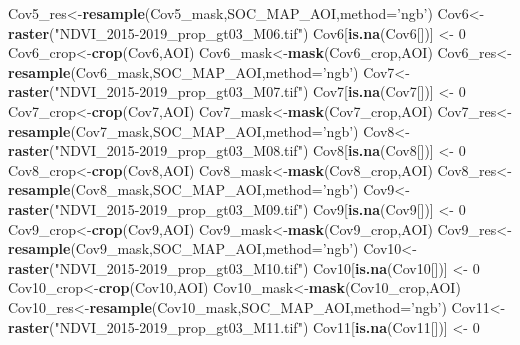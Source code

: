 \documentclass[
  10pt,
  b5paper,
]{book}
\newenvironment{Shaded}{\begin{snugshade}}{\end{snugshade}}
\newcommand{\DataTypeTok}[1]{\textcolor[rgb]{0.13,0.29,0.53}{#1}}
\newcommand{\DecValTok}[1]{\textcolor[rgb]{0.00,0.00,0.81}{#1}}
\newcommand{\KeywordTok}[1]{\textcolor[rgb]{0.13,0.29,0.53}{\textbf{#1}}}
\newcommand{\NormalTok}[1]{#1}
\newcommand{\StringTok}[1]{\textcolor[rgb]{0.31,0.60,0.02}{#1}}
\begin{document}
\begin{Shaded}
\begin{Highlighting}[]
\NormalTok{Cov5_res<-}\KeywordTok{resample}\NormalTok{(Cov5_mask,SOC_MAP_AOI,}\DataTypeTok{method=}\StringTok{'ngb'}\NormalTok{) }
\NormalTok{Cov6<-}\KeywordTok{raster}\NormalTok{(}\StringTok{"NDVI_2015-2019_prop_gt03_M06.tif"}\NormalTok{)}
\NormalTok{Cov6[}\KeywordTok{is.na}\NormalTok{(Cov6[])] <-}\StringTok{ }\DecValTok{0}
\NormalTok{Cov6_crop<-}\KeywordTok{crop}\NormalTok{(Cov6,AOI)}
\NormalTok{Cov6_mask<-}\KeywordTok{mask}\NormalTok{(Cov6_crop,AOI)}
\NormalTok{Cov6_res<-}\KeywordTok{resample}\NormalTok{(Cov6_mask,SOC_MAP_AOI,}\DataTypeTok{method=}\StringTok{'ngb'}\NormalTok{) }
\NormalTok{Cov7<-}\KeywordTok{raster}\NormalTok{(}\StringTok{"NDVI_2015-2019_prop_gt03_M07.tif"}\NormalTok{)}
\NormalTok{Cov7[}\KeywordTok{is.na}\NormalTok{(Cov7[])] <-}\StringTok{ }\DecValTok{0}
\NormalTok{Cov7_crop<-}\KeywordTok{crop}\NormalTok{(Cov7,AOI)}
\NormalTok{Cov7_mask<-}\KeywordTok{mask}\NormalTok{(Cov7_crop,AOI)}
\NormalTok{Cov7_res<-}\KeywordTok{resample}\NormalTok{(Cov7_mask,SOC_MAP_AOI,}\DataTypeTok{method=}\StringTok{'ngb'}\NormalTok{) }
\NormalTok{Cov8<-}\KeywordTok{raster}\NormalTok{(}\StringTok{"NDVI_2015-2019_prop_gt03_M08.tif"}\NormalTok{)}
\NormalTok{Cov8[}\KeywordTok{is.na}\NormalTok{(Cov8[])] <-}\StringTok{ }\DecValTok{0}
\NormalTok{Cov8_crop<-}\KeywordTok{crop}\NormalTok{(Cov8,AOI)}
\NormalTok{Cov8_mask<-}\KeywordTok{mask}\NormalTok{(Cov8_crop,AOI)}
\NormalTok{Cov8_res<-}\KeywordTok{resample}\NormalTok{(Cov8_mask,SOC_MAP_AOI,}\DataTypeTok{method=}\StringTok{'ngb'}\NormalTok{) }
\NormalTok{Cov9<-}\KeywordTok{raster}\NormalTok{(}\StringTok{"NDVI_2015-2019_prop_gt03_M09.tif"}\NormalTok{)}
\NormalTok{Cov9[}\KeywordTok{is.na}\NormalTok{(Cov9[])] <-}\StringTok{ }\DecValTok{0}
\NormalTok{Cov9_crop<-}\KeywordTok{crop}\NormalTok{(Cov9,AOI)}
\NormalTok{Cov9_mask<-}\KeywordTok{mask}\NormalTok{(Cov9_crop,AOI)}
\NormalTok{Cov9_res<-}\KeywordTok{resample}\NormalTok{(Cov9_mask,SOC_MAP_AOI,}\DataTypeTok{method=}\StringTok{'ngb'}\NormalTok{) }
\NormalTok{Cov10<-}\KeywordTok{raster}\NormalTok{(}\StringTok{"NDVI_2015-2019_prop_gt03_M10.tif"}\NormalTok{)}
\NormalTok{Cov10[}\KeywordTok{is.na}\NormalTok{(Cov10[])] <-}\StringTok{ }\DecValTok{0}
\NormalTok{Cov10_crop<-}\KeywordTok{crop}\NormalTok{(Cov10,AOI)}
\NormalTok{Cov10_mask<-}\KeywordTok{mask}\NormalTok{(Cov10_crop,AOI)}
\NormalTok{Cov10_res<-}\KeywordTok{resample}\NormalTok{(Cov10_mask,SOC_MAP_AOI,}\DataTypeTok{method=}\StringTok{'ngb'}\NormalTok{) }
\NormalTok{Cov11<-}\KeywordTok{raster}\NormalTok{(}\StringTok{"NDVI_2015-2019_prop_gt03_M11.tif"}\NormalTok{)}
\NormalTok{Cov11[}\KeywordTok{is.na}\NormalTok{(Cov11[])] <-}\StringTok{ }\DecValTok{0}

\end{Highlighting}
\end{Shaded}
\end{document}

